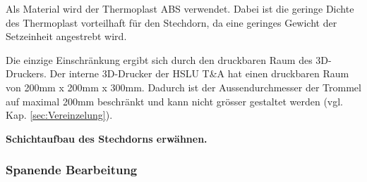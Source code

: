 Als Material wird der Thermoplast ABS verwendet. Dabei ist die geringe Dichte des Thermoplast vorteilhaft für den Stechdorn, da eine geringes Gewicht der Setzeinheit angestrebt wird.
\newline

Die einzige Einschränkung ergibt sich durch den druckbaren Raum des 3D-Druckers. Der interne 3D-Drucker der HSLU T\&A hat einen druckbaren Raum von 200mm x 200mm x 300mm. Dadurch ist der Aussendurchmesser der Trommel auf maximal 200mm beschränkt und kann nicht grösser gestaltet werden (vgl. Kap. \ref{sec:Vereinzelung}).

\textbf{Schichtaufbau des Stechdorns erwähnen.}

\subsubsection{Spanende Bearbeitung}